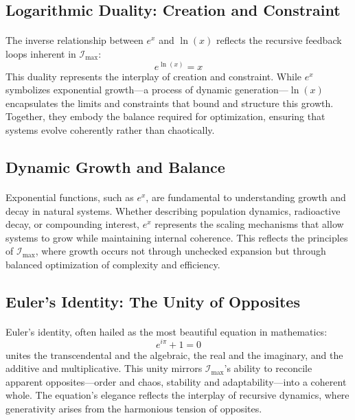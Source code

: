 \documentclass[12pt]{article}
\begin{document}
\subsection{Logarithmic Duality: Creation and Constraint}
\paragraph{}
The inverse relationship between \(e^x\) and \(\ln(x)\) reflects the recursive feedback loops inherent in \(\mathcal{I}_{\text{max}}\):
\[
e^{\ln(x)} = x
\]
This duality represents the interplay of creation and constraint. While \(e^x\) symbolizes exponential growth—a process of dynamic generation—\(\ln(x)\) encapsulates the limits and constraints that bound and structure this growth. Together, they embody the balance required for optimization, ensuring that systems evolve coherently rather than chaotically.

\subsection{Dynamic Growth and Balance}
\paragraph{}
Exponential functions, such as \(e^x\), are fundamental to understanding growth and decay in natural systems. Whether describing population dynamics, radioactive decay, or compounding interest, \(e^x\) represents the scaling mechanisms that allow systems to grow while maintaining internal coherence. This reflects the principles of \(\mathcal{I}_{\text{max}}\), where growth occurs not through unchecked expansion but through balanced optimization of complexity and efficiency.

\subsection{Euler’s Identity: The Unity of Opposites}
\paragraph{}
Euler’s identity, often hailed as the most beautiful equation in mathematics:
\[
e^{i\pi} + 1 = 0
\]
unites the transcendental and the algebraic, the real and the imaginary, and the additive and multiplicative. This unity mirrors \(\mathcal{I}_{\text{max}}\)’s ability to reconcile apparent opposites—order and chaos, stability and adaptability—into a coherent whole. The equation’s elegance reflects the interplay of recursive dynamics, where generativity arises from the harmonious tension of opposites.
\end{document}
